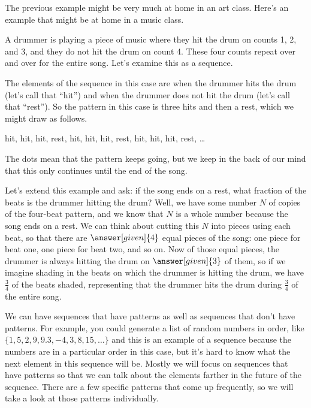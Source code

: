 \documentclass{ximera}
\begin{document}
The previous example might be very much at home in an art class. Here's an example that might be at home in a music class.
\begin{example}
A drummer is playing a piece of music where they hit the drum on counts 1, 2, and 3, and they do not hit the drum on count 4. These four counts repeat over and over for the entire song. Let's examine this as a sequence.

The elements of the sequence in this case are when the drummer hits the drum (let's call that ``hit'') and when the drummer does not hit the drum (let's call that ``rest''). So the pattern in this case is three hits and then a rest, which we might draw as follows.

\begin{center}
hit, hit, hit, rest, hit, hit, hit, rest, hit, hit, hit, rest, \dots
\end{center}

The dots mean that the pattern keeps going, but we keep in the back of our mind that this only continues until the end of the song.

Let's extend this example and ask: if the song ends on a rest, what fraction of the beats is the drummer hitting the drum? Well, we have some number $N$ of copies of the four-beat pattern, and we know that $N$ is a whole number because the song ends on a rest. We can think about cutting this $N$ into pieces using each beat, so that there are $\answer[given]{4}$ equal pieces of the song: one piece for beat one, one piece for beat two, and so on. Now of those equal pieces, the drummer is always hitting the drum on $\answer[given]{3}$ of them, so if we imagine shading in the beats on which the drummer is hitting the drum, we have $\frac{3}{4}$ of the beats shaded, representing that the drummer hits the drum during $\frac{3}{4}$ of the entire song.

\end{example}

We can have sequences that have patterns as well as sequences that don't have patterns. For example, you could generate a list of random numbers in order, like $\{ 1, 5, 2, 9, 9.3, -4, 3, 8, 15, \dots\}$ and this is an example of a sequence because the numbers are in a particular order in this case, but it's hard to know what the next element in this sequence will be. Mostly we will focus on sequences that have patterns so that we can talk about the elements farther in the future of the sequence. There are a few specific patterns that come up frequently, so we will take a look at those patterns individually.
\end{document}
